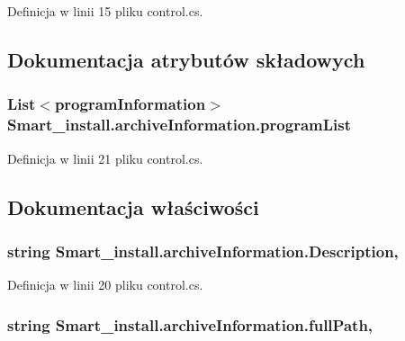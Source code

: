 Definicja w linii 15 pliku control.\+cs.



\subsection{Dokumentacja atrybutów składowych}
\hypertarget{class_smart__install_1_1archive_information_aab785a5739f5bbf6f045d7ee81a5a19e}{
\subsubsection[{program\+List}]{\setlength{\rightskip}{0pt plus 5cm}List$<${\bf program\+Information}$>$ Smart\+\_\+install.\+archive\+Information.\+program\+List}}\label{class_smart__install_1_1archive_information_aab785a5739f5bbf6f045d7ee81a5a19e}


Definicja w linii 21 pliku control.\+cs.



\subsection{Dokumentacja właściwości}
\hypertarget{class_smart__install_1_1archive_information_a19ec6b73a8b2b58edca7eefb28839d0f}{
\subsubsection[{Description}]{\setlength{\rightskip}{0pt plus 5cm}string Smart\+\_\+install.\+archive\+Information.\+Description\hspace{0.3cm}{\ttfamily [get]}, {\ttfamily [set]}}}\label{class_smart__install_1_1archive_information_a19ec6b73a8b2b58edca7eefb28839d0f}


Definicja w linii 20 pliku control.\+cs.

\hypertarget{class_smart__install_1_1archive_information_a19cf8082aecdf5cf77551b5831c650f6}{
\subsubsection[{full\+Path}]{\setlength{\rightskip}{0pt plus 5cm}string Smart\+\_\+install.\+archive\+Information.\+full\+Path\hspace{0.3cm}{\ttfamily [get]}, {\ttfamily [set]}}}\label{class_smart__install_1_1archive_information_a19cf8082aecdf5cf77551b5831c650f6}


